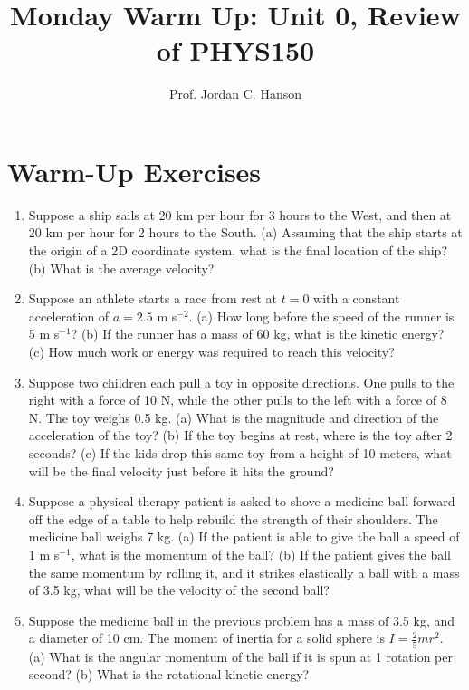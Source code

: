 \documentclass{article}
\begin{document}
\twocolumn

\title{Monday Warm Up: Unit 0, Review of PHYS150}
\author{Prof. Jordan C. Hanson}

\maketitle

\section{Warm-Up Exercises}

\begin{enumerate}
\item Suppose a ship sails at 20 km per hour for 3 hours to the West, and then at 20 km per hour for 2 hours to the South.  (a) Assuming that the ship starts at the origin of a 2D coordinate system, what is the final location of the ship? (b) What is the average velocity? \\ \vspace{4cm}
\item Suppose an athlete starts a race from rest at $t=0$ with a constant acceleration of $a = 2.5$ m s$^{-2}$.  (a) How long before the speed of the runner is 5 m s$^{-1}$? (b) If the runner has a mass of 60 kg, what is the kinetic energy? (c) How much work or energy was required to reach this velocity? \\ \vspace{4cm}
\item Suppose two children each pull a toy in opposite directions.  One pulls to the right with a force of 10 N, while the other pulls to the left with a force of 8 N.  The toy weighs 0.5 kg. (a) What is the magnitude and direction of the acceleration of the toy? (b) If the toy begins at rest, where is the toy after 2 seconds? (c) If the kids drop this same toy from a height of 10 meters, what will be the final velocity just before it hits the ground? \\ \vspace{4cm}
\item Suppose a physical therapy patient is asked to shove a medicine ball forward off the edge of a table to help rebuild the strength of their shoulders.  The medicine ball weighs 7 kg.  (a) If the patient is able to give the ball a speed of 1 m s$^{-1}$, what is the momentum of the ball? (b) If the patient gives the ball the same momentum by rolling it, and it strikes elastically a ball with a mass of 3.5 kg, what will be the velocity of the second ball? \\ \vspace{4cm}
\item Suppose the medicine ball in the previous problem has a mass of 3.5 kg, and a diameter of 10 cm.  The moment of inertia for a solid sphere is $I = \frac{2}{5} m r^2$. (a) What is the angular momentum of the ball if it is spun at 1 rotation per second? (b) What is the rotational kinetic energy?
\end{enumerate}
\end{document}

